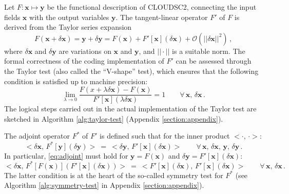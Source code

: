 \documentclass[gmd,manuscript,online]{copernicus}
\theoremstyle{theorem}
\theoremstyle{definition}
\theoremstyle{remark}
\theoremstyle{proposition}
\begin{document}
	Let $F: \boldsymbol{x} \mapsto \boldsymbol{y}$ be the functional description of CLOUDSC2, connecting the input fields $\boldsymbol{x}$ with the output variables $\boldsymbol{y}$. The tangent-linear operator $F'$ of $F$ is derived from the Taylor series expansion
	\begin{equation}
		F \left( \boldsymbol{x} + \delta \boldsymbol{x} \right) = \boldsymbol{y} + \delta \boldsymbol{y} = F \left( \boldsymbol{x} \right) + F' \left[ \boldsymbol{x} \right] \left( \delta \boldsymbol{x} \right) + \mathcal{O} \left( ||\delta \boldsymbol{x} ||^2 \right) \, ,
	\end{equation}
	where $\delta \boldsymbol{x}$ and $\delta \boldsymbol{y}$ are variations on $\boldsymbol{x}$ and $\boldsymbol{y}$, and $|| \cdot ||$ is a suitable norm. The formal correctness of the coding implementation of $F'$ can be assessed through the Taylor test (also called the ``V-shape'' test), which ensures that the following condition is satisfied up to machine precision:
	\begin{equation}
		\lim_{\lambda \to 0} \dfrac{F \left( x + \lambda \delta \boldsymbol{x} \right) - F \left( \boldsymbol{x} \right)}{F' \left[ \boldsymbol{x} \right] \left( \lambda \delta \boldsymbol{x} \right)} = 1 \qquad \forall \, \boldsymbol{x}, \, \delta \boldsymbol{x} \, .
	\end{equation}
	The logical steps carried out in the actual implementation of the Taylor test are sketched in Algorithm \ref{alg:taylor-test} (Appendix \ref{section:appendix}).

	The adjoint operator $F^*$ of $F'$ is defined such that for the inner product $< \cdot, \, \cdot >$:
	\begin{equation}
		\label{eq:adjoint}
		< \delta \boldsymbol{x}, \, F^* \left[ \boldsymbol{y} \right] \left( \delta \boldsymbol{y} \right) > ~ = ~ < \delta \boldsymbol{y}, \, F' \left[ \boldsymbol{x} \right] \left( \delta \boldsymbol{x} \right) > \qquad \forall \, \boldsymbol{x}, \, \delta \boldsymbol{x}, \, \boldsymbol{y}, \, \delta \boldsymbol{y} \, .
	\end{equation}
	In particular, \eqref{eq:adjoint} must hold for $\boldsymbol{y} = F \left( \boldsymbol{x} \right)$ and $\delta \boldsymbol{y} = F' \left[ \boldsymbol{x} \right] \left( \delta \boldsymbol{x} \right)$:
	\begin{equation}
		\label{eq:symmetry-test}
		< \delta \boldsymbol{x}, \, F^* \left[ F \left( \boldsymbol{x} \right) \right] \left( F' \left[ \boldsymbol{x} \right] \left( \delta \boldsymbol{x} \right) \right) > ~ = ~ < F' \left[ \boldsymbol{x} \right] \left( \delta \boldsymbol{x} \right), \, F' \left[ \boldsymbol{x} \right] \left( \delta \boldsymbol{x} \right) > \qquad \forall \, \boldsymbol{x}, \, \delta \boldsymbol{x} \, .
	\end{equation}
	The latter condition is at the heart of the so-called symmetry test for $F^*$ (see Algorithm \ref{alg:symmetry-test} in Appendix \ref{section:appendix}).
\end{document}
